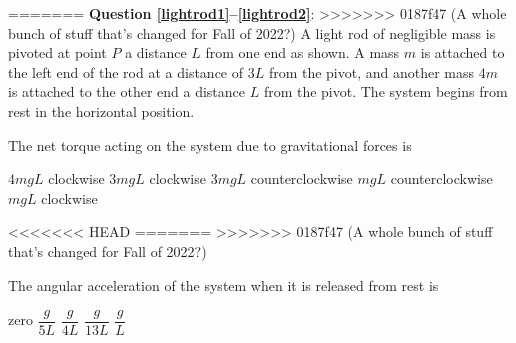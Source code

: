 \documentclass{../../oss-apphys-exam}
\begin{document}
\begin{multicols*}{2}
\begin{questions}
{=======
      \textbf{Question \ref{lightrod1}--\ref{lightrod2}}:
>>>>>>> 0187f47 (A whole bunch of stuff that's changed for Fall of 2022?)
      A light rod of negligible mass is pivoted at point $P$ a distance
      $L$ from one end as shown. A mass $m$ is attached to the left end of the
      rod at a distance of $3L$ from the pivot, and another mass $4m$ is
      attached to the other end a distance $L$ from the pivot. The system
      begins from rest in the horizontal position.
      \begin{center}
      \end{center}
    }
    
    \question The net torque acting on the system due to gravitational forces is
    \label{lightrod1}
    \begin{choices}
      \choice $4mgL$ clockwise
      \choice $3mgL$ clockwise
      \choice $3mgL$ counterclockwise
      \choice $mgL$ counterclockwise
      \choice $mgL$ clockwise
    \end{choices}
<<<<<<< HEAD
=======
    \vspace{.6in}
>>>>>>> 0187f47 (A whole bunch of stuff that's changed for Fall of 2022?)
    
    \question The angular acceleration of the system when it is released from
    rest is
    \label{lightrod2}
    \begin{choices}
      \choice zero
      \choice $\dfrac g{5L}$
      \choice $\dfrac g{4L}$
      \choice $\dfrac g{13L}$
      \choice $\dfrac gL$
    \end{choices}
    

\end{questions}
\end{multicols*}
\end{document}
